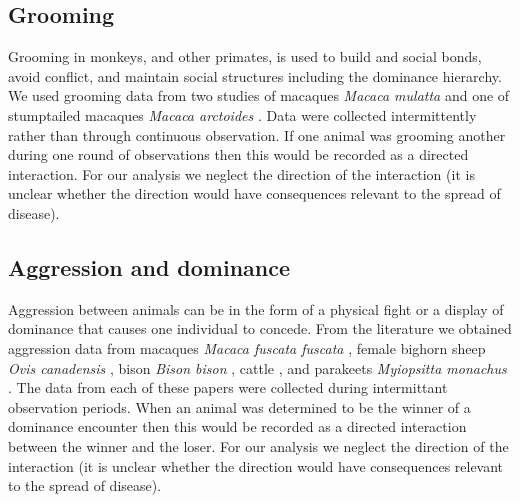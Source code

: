 \documentclass[10pt]{article}
\begin{document}
\begin{multicols}{2}
\subsection{Grooming}
Grooming in monkeys, and other primates, is used to build and social bonds, avoid conflict, and maintain social structures including the dominance hierarchy. We used grooming data from two studies of macaques \emph{Macaca mulatta} \cite{massen2013stability,sade1972sociometrics} and one of stumptailed macaques \emph{Macaca arctoides} \cite{butovskaya1994structure}. Data were collected intermittently rather than through continuous observation. If one animal was grooming another during one round of observations then this would be recorded as a directed interaction. For our analysis we neglect the direction of the interaction (it is unclear whether the direction would have consequences relevant to the spread of disease).

\subsection{Aggression and dominance}
Aggression between animals can be in the form of a physical fight or a display of dominance that causes one individual to concede. From the literature we obtained aggression data from macaques \emph{Macaca fuscata fuscata} \cite{takahata1991diachronic}, female bighorn sheep \emph{Ovis canadensis} \cite{hass1991social}, bison \emph{Bison bison} \cite{lott1979dominance}, cattle \cite{SCHEIN195545}, and parakeets \emph{Myiopsitta monachus} \cite{hobson2015social}. The data from each of these papers were collected during intermittant observation periods. When an animal was determined to be the winner of a dominance encounter then this would be recorded as a directed interaction between the winner and the loser. For our analysis we neglect the direction of the interaction (it is unclear whether the direction would have consequences relevant to the spread of disease).
\end{multicols}
\end{document}
